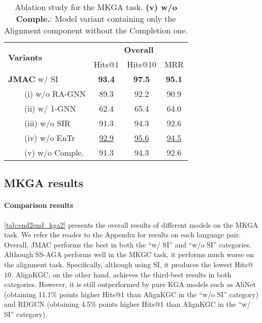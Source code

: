 \documentclass[11pt]{article}
\begin{document}
\begin{table}[!t]
    \begin{adjustbox}{width=210pt,center}
    \centering
    \setlength{\tabcolsep}{0.4em}
    \def\arraystretch{1.1}
    \begin{tabular}{l|c|c|c}
    \hline
    \multirow{2}{*}{\bf Variants} & 
    \multicolumn{3}{c}{\bf Overall} \\
    \cline{2-4}
    & Hits@1 & Hits@10 & MRR \\
    \hline
\textbf{JMAC} w/ SI & \bf 93.4 & \bf 97.5 & \bf 95.1 \\
    \hline
    \ \ \ \ (i) w/o RA-GNN & 89.3 & 92.2 & 90.9 \\
    \ \ \ \ (ii) w/ 1-GNN & 62.4 & 65.4 & 64.0\\
    \ \ \ \ (iii) w/o SIR & 91.3 & 94.3 & 92.6 \\
    \ \ \ \ (iv) w/o EnTr & \underline{92.9} & \underline{95.6} & \underline{94.5} \\
    \ \ \ \ (v) w/o Comple. & 91.3 & 94.3 & 92.6 \\
    \hline
\end{tabular}
    \end{adjustbox}
    \caption{Ablation study for the MKGA task. \textbf{(v) w/o Comple.}: Model variant containing only the Alignment component without the Completion one. }
    \label{tab:ablation_kga_new}
\end{table}



\subsection{MKGA results}\label{ssec:mkgaresults}



\paragraph{Comparison results} \autoref{tab:end2end_kga2} presents the overall results of different models on the MKGA task. We refer the reader to the Appendix for results on each language pair. 
Overall, JMAC performs the best in both the ``w/ SI'' and ``w/o SI'' categories. Although SS-AGA performs well in the MKGC task, it performs much worse on the alignment task. Specifically, although using SI, it produces the lowest Hits@$10$. {AlignKGC}, on the other hand, achieves the third-best results in both categories. However, it is still outperformed by pure KGA models such as {AliNet} (obtaining 11.1\% points higher Hits@1 than AlignKGC in the ``w/o SI'' category) and {RDGCN} (obtaining 4.5\% points higher Hits@1 than AlignKGC in the ``w/ SI'' category). 
\end{document}
